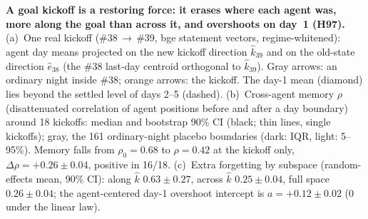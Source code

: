 \caption{\textbf{A goal kickoff is a restoring force: it erases where each agent was, more along the goal than across it, and overshoots on day~1 (H97).}
(a)~One real kickoff (\#38\,$\rightarrow$\,\#39, bge statement vectors, regime-whitened): agent day means projected on the new kickoff direction $\hat k_{39}$ and on the old-state direction $\hat e_{38}$ (the \#38 last-day centroid orthogonal to $\hat k_{39}$). Gray arrows: an ordinary night inside \#38; orange arrows: the kickoff. The day-1 mean (diamond) lies beyond the settled level of days 2--5 (dashed).
(b)~Cross-agent memory $\rho$ (disattenuated correlation of agent positions before and after a day boundary) around 18 kickoffs: median and bootstrap 90\% CI (black; thin lines, single kickoffs); gray, the 161 ordinary-night placebo boundaries (dark: IQR, light: 5--95\%). Memory falls from $\rho_0=0.68$ to $\rho=0.42$ at the kickoff only, $\Delta\rho=+0.26\pm0.04$, positive in 16/18.
(c)~Extra forgetting by subspace (random-effects mean, 90\% CI): along $\hat k$ $0.63\pm0.27$, across $\hat k$ $0.25\pm0.04$, full space $0.26\pm0.04$; the agent-centered day-1 overshoot intercept is $a=+0.12\pm0.02$ (0 under the linear law).}
\label{fig:H97}
